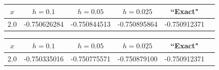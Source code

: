 \bigskip

{\small
\begin{tabular}{|c|r|r|r|r|r|}
\hline
\multicolumn{1}{|c|}{$x$}&
\multicolumn{1}{|c|}{$h=0.1$}&
\multicolumn{1}{|c|}{$h=0.05$}&
\multicolumn{1}{|c|}{$h=0.025$}&
\multicolumn{1}{|c|}{``Exact"}\\ \hline
2.0 &-0.750626284 &-0.750844513  &-0.750895864  & -0.750912371 \\
\hline
\end{tabular}}

{\small
\begin{tabular}{|c|r|r|r|r|r|}
\hline
\multicolumn{1}{|c|}{$x$}&
\multicolumn{1}{|c|}{$h=0.1$}&
\multicolumn{1}{|c|}{$h=0.05$}&
\multicolumn{1}{|c|}{$h=0.025$}&
\multicolumn{1}{|c|}{``Exact"}\\ \hline
2.0 &-0.750335016 &-0.750775571  & -0.750879100 & -0.750912371 \\
\hline
\end{tabular}}

